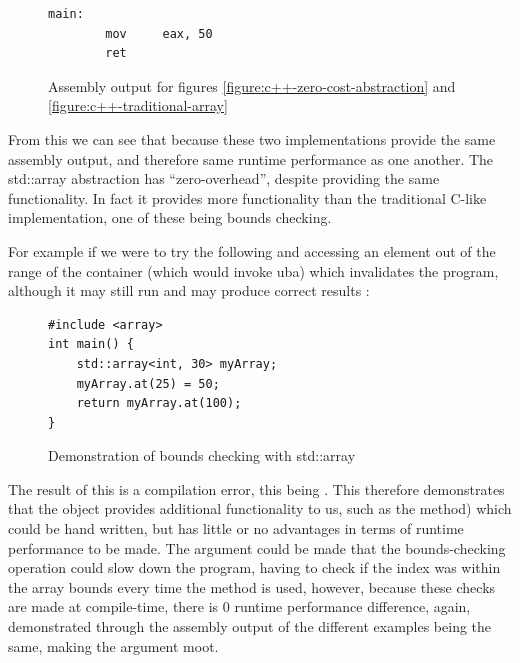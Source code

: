 \documentclass[a4paper]{article}
\begin{document}
\begin{figure}[H]
	\begin{lstlisting}[language={[x86masm]Assembler}]
main:
        mov     eax, 50
        ret
				\end{lstlisting}
	\caption{Assembly output for figures \ref{figure:c++-zero-cost-abstraction} and \ref{figure:c++-traditional-array}}
	\label{figure:code:assembly-c++-array}
\end{figure}

From this we can see that because these two implementations provide the same assembly output, and therefore same runtime performance as one another. The std::array abstraction has ``zero-overhead'', despite providing the same functionality. In fact it provides more functionality than the traditional C-like implementation, one of these being bounds checking.

For example if we were to try the following and accessing an element out of the range of the container (which would invoke \gls{uba}) which invalidates the program, although it may still run and may produce correct results \parencite{cpp-reference-ub}:

\begin{figure}[H]
	\begin{lstlisting}
#include <array>
int main() {
    std::array<int, 30> myArray;
    myArray.at(25) = 50;
    return myArray.at(100);
}
 	\end{lstlisting}
	\caption{Demonstration of bounds checking with std::array}
\end{figure}

The result of this is a compilation error, this being  . This therefore demonstrates that the  object provides additional functionality to us, such as the          method) which could be hand written, but has little or no advantages in terms of runtime performance to be made.
The argument could be made that the bounds-checking operation could slow down the program, having to check if the index was within the array bounds every time the  method is used, however, because these checks are made at compile-time, there is 0 runtime performance difference, again, demonstrated through the assembly output of the different examples being the same, making the argument moot.
\end{document}
